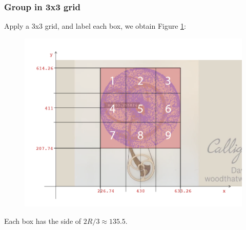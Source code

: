 \documentclass[a4paper,12pt]{article}
\begin{document}
    \subsubsection{Group in 3x3 grid}

    Apply a 3x3 grid, and label each box, we obtain Figure \ref{fig:boxes_sculpt_cartesian}:

    \begin{figure}[H]
        \begin{center}
            \includegraphics[width=\textwidth]{boxes_sculpt_cartesian} 
        \end{center}
        \caption{}
        \label{fig:boxes_sculpt_cartesian}
    \end{figure}

    Each box has the side of $2R/3 \approx 135.5$.
\end{document}
